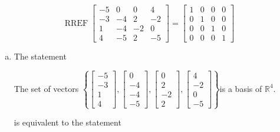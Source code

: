 \begin{exerciseAnswer} 


\[\operatorname{RREF} \left[\begin{array}{cccc}
-5 & 0 & 0 & 4 \\
-3 & -4 & 2 & -2 \\
1 & -4 & -2 & 0 \\
4 & -5 & 2 & -5
\end{array}\right] = \left[\begin{array}{cccc}
1 & 0 & 0 & 0 \\
0 & 1 & 0 & 0 \\
0 & 0 & 1 & 0 \\
0 & 0 & 0 & 1
\end{array}\right] \]


\begin{enumerate}[(a)]
\item The statement 
\begin{center}\begin{minipage}{0.8\textwidth}
 The set of vectors \( \left\{ \left[\begin{array}{c}
-5 \\
-3 \\
1 \\
4
\end{array}\right] , \left[\begin{array}{c}
0 \\
-4 \\
-4 \\
-5
\end{array}\right] , \left[\begin{array}{c}
0 \\
2 \\
-2 \\
2
\end{array}\right] , \left[\begin{array}{c}
4 \\
-2 \\
0 \\
-5
\end{array}\right] \right\} \)is a basis of \(\mathbb{R}^4\). 
\end{minipage}\end{center}
     is equivalent to the statement 
\begin{center}\begin{minipage}{0.8\textwidth}
 The set of vectors \( \left\{ \left[\begin{array}{c}
-5 \\
-3 \\

\end{array}
\end{minipage}
\end{center}
\end{enumerate}
\end{exerciseAnswer}
